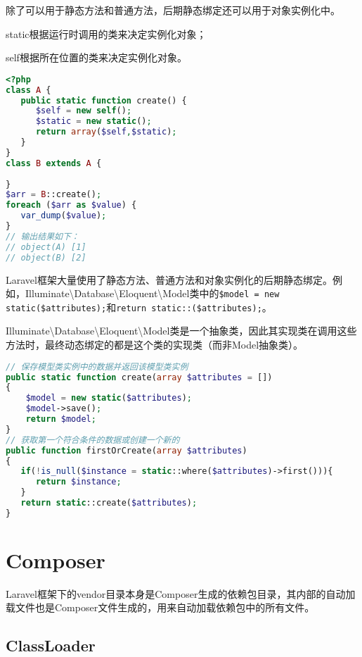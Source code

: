 除了可以用于静态方法和普通方法，后期静态绑定还可以用于对象实例化中。

\begin{compactitem}
\item static根据运行时调用的类来决定实例化对象；
\item self根据所在位置的类来决定实例化对象。
\end{compactitem}


\begin{lstlisting}[language=PHP]
<?php
class A {
   public static function create() {
      $self = new self();
      $static = new static();
      return array($self,$static);
   }
}
class B extends A {
   
}
$arr = B::create();
foreach ($arr as $value) {
   var_dump($value);
}
// 输出结果如下：
// object(A) [1]
// object(B) [2]
\end{lstlisting}

Laravel框架大量使用了静态方法、普通方法和对象实例化的后期静态绑定。例如，Illuminate\textbackslash Database\textbackslash Eloquent\textbackslash Model类中的\texttt{\$model = new static(\$attributes);}和\texttt{return static::(\$attributes);}。

Illuminate\textbackslash Database\textbackslash Eloquent\textbackslash Model类是一个抽象类，因此其实现类在调用这些方法时，最终动态绑定的都是这个类的实现类（而非Model抽象类）。


\begin{lstlisting}[language=PHP]
// 保存模型类实例中的数据并返回该模型类实例
public static function create(array $attributes = [])
{
    $model = new static($attributes);
    $model->save();
    return $model;
}
// 获取第一个符合条件的数据或创建一个新的
public function firstOrCreate(array $attributes) 
{
   if(!is_null($instance = static::where($attributes)->first())){
      return $instance;
   }
   return static::create($attributes);
}
\end{lstlisting}


\chapter{Composer}

Laravel框架下的vendor目录本身是Composer生成的依赖包目录，其内部的自动加载文件也是Composer文件生成的，用来自动加载依赖包中的所有文件。


\section{ClassLoader}


